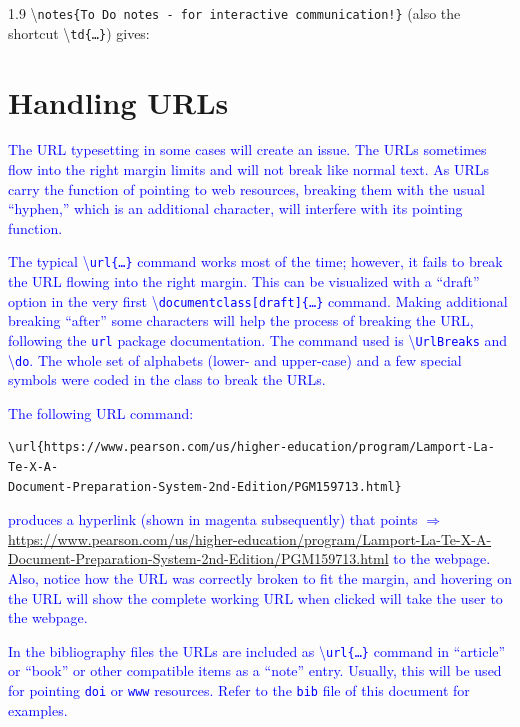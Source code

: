 \documentclass[phd]{ndsu-thesis-2022}
\newcommand\myspacing{1.9} %
\newcommand\italk[1]{\textcolor{blue}{#1}}  %
\newcommand\cmd[1]{\textbackslash\texttt{#1}}  %
\begin{document}
\begin{spacing}{\myspacing}
\vspace{1.5ex}
\textbackslash\texttt{notes\{To Do notes - for interactive communication!\}} (also the shortcut \cmd{td\{\ldots\}}) gives:  

\section{Handling URLs}
\italk{The URL typesetting in some cases will create an issue. The URLs sometimes flow into the right margin limits and will not break like normal text. As URLs carry the function of pointing to web resources, breaking them with the usual ``hyphen,'' which is an additional character, will interfere with its pointing function.} 

\italk{The typical \cmd{url\{\ldots\}} command works most of the time; however, it fails to break the URL flowing into the right margin. This can be visualized with a ``draft'' option in the very first \cmd{documentclass[draft]\{\ldots\}} command. Making additional breaking ``after'' some characters will help the process of breaking the URL, following the \texttt{url} package documentation. The command used is \cmd{UrlBreaks} and \cmd{do}. The whole set of alphabets (lower- and upper-case) and a few special symbols were coded in the class to break the URLs.}

\italk{The following URL command:} 
\vspace{-2ex}
\begin{verbatim}
\url{https://www.pearson.com/us/higher-education/program/Lamport-La-Te-X-A-
Document-Preparation-System-2nd-Edition/PGM159713.html}
\end{verbatim}

\noindent \italk{produces a hyperlink (shown in magenta subsequently) that points $\Rightarrow$ }\textcolor{magenta}{\url{https://www.pearson.com/us/higher-education/program/Lamport-La-Te-X-A-Document-Preparation-System-2nd-Edition/PGM159713.html}} \italk{to the webpage. Also, notice how the URL was correctly broken to fit the margin, and hovering on the URL will show the complete working URL when clicked will take the user to the webpage.}

\italk{In the bibliography files the URLs are included as \cmd{url\{\ldots\}} command in ``article'' or ``book'' or other compatible items as a ``note'' entry. Usually, this will be used for pointing \texttt{doi} or \texttt{www} resources. Refer to the \texttt{bib} file of this document for examples. } 


\end{spacing}
\end{document}
